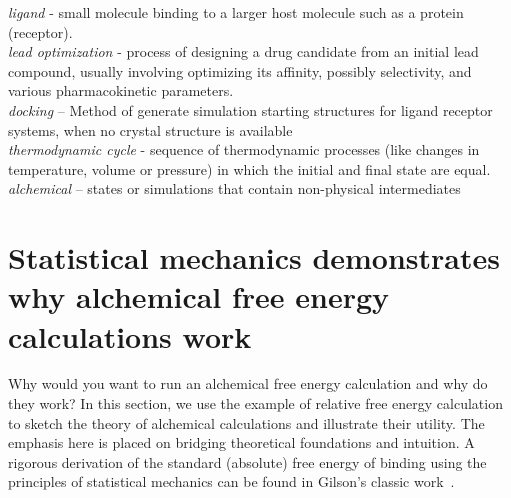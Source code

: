 \documentclass[9pt,bestpractices]{livecoms}
\begin{document}
\begin{tcolorbox}[title=Common terminology, colback=yellow!10!white]
    \emph{ligand} - small molecule binding to a larger host molecule such as a protein (receptor).\\ 
    \emph{lead optimization} - process of designing a drug candidate from an initial lead compound, usually involving optimizing its affinity, possibly selectivity, and various pharmacokinetic parameters.\\
    \emph{docking} -- Method of generate simulation starting structures for ligand receptor systems, when no crystal structure is available\\
    \emph{thermodynamic cycle} - sequence of thermodynamic processes (like changes in temperature, volume or pressure) in which the initial and final state are equal.\\
    \emph{alchemical} -- states or simulations that contain non-physical intermediates \\
\end{tcolorbox}

\section{Statistical mechanics demonstrates why alchemical free energy calculations work}
\label{sec:theory}
Why would you want to run an alchemical free energy calculation and why do they work?
In this section, we use the example of relative free energy calculation to sketch the theory of alchemical calculations and illustrate their utility.
The emphasis here is placed on bridging theoretical foundations and intuition.
A rigorous derivation of the standard (absolute) free energy of binding using the principles of statistical mechanics can be found in Gilson's classic work~\cite{gilson1997statisticalthermodynamic}.
\end{document}
